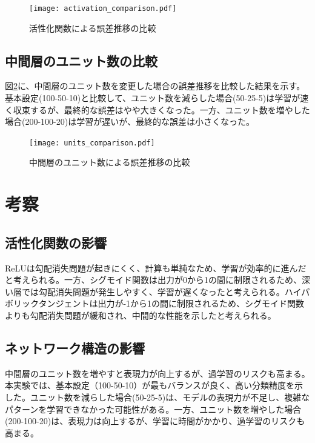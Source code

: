 \documentclass{article}
\begin{document}
\begin{figure}[htbp]
  \centering
  \texttt{[image: activation\_comparison.pdf]}
  \caption{活性化関数による誤差推移の比較}
  \label{fig:activation_comparison}
\end{figure}

\subsection{中間層のユニット数の比較}
図\ref{fig:units_comparison}に、中間層のユニット数を変更した場合の誤差推移を比較した結果を示す。基本設定(100-50-10)と比較して、ユニット数を減らした場合(50-25-5)は学習が速く収束するが、最終的な誤差はやや大きくなった。一方、ユニット数を増やした場合(200-100-20)は学習が遅いが、最終的な誤差は小さくなった。

\begin{figure}[htbp]
  \centering
  \texttt{[image: units\_comparison.pdf]}
  \caption{中間層のユニット数による誤差推移の比較}
  \label{fig:units_comparison}
\end{figure}


\section{考察}
\subsection{活性化関数の影響}
ReLUは勾配消失問題が起きにくく、計算も単純なため、学習が効率的に進んだと考えられる。一方、シグモイド関数は出力が0から1の間に制限されるため、深い層では勾配消失問題が発生しやすく、学習が遅くなったと考えられる。ハイパボリックタンジェントは出力が-1から1の間に制限されるため、シグモイド関数よりも勾配消失問題が緩和され、中間的な性能を示したと考えられる。

\subsection{ネットワーク構造の影響}
中間層のユニット数を増やすと表現力が向上するが、過学習のリスクも高まる。本実験では、基本設定（100-50-10）が最もバランスが良く、高い分類精度を示した。ユニット数を減らした場合(50-25-5)は、モデルの表現力が不足し、複雑なパターンを学習できなかった可能性がある。一方、ユニット数を増やした場合(200-100-20)は、表現力は向上するが、学習に時間がかかり、過学習のリスクも高まる。
\end{document}
